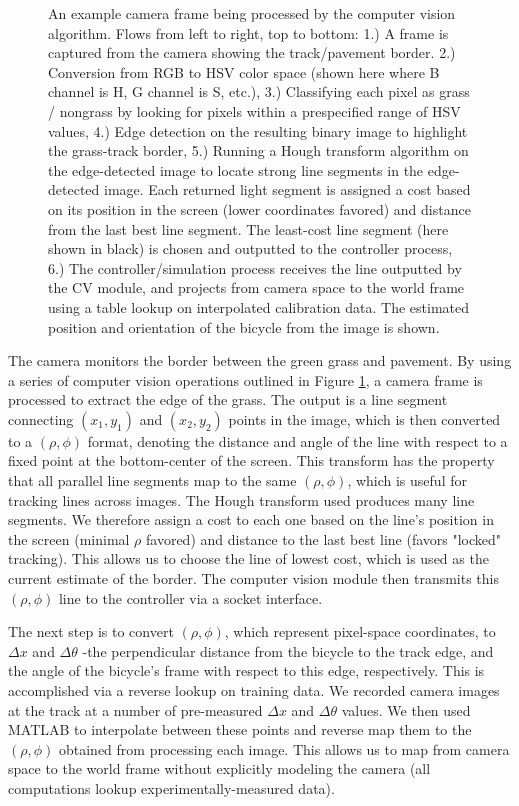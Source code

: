 \documentclass[aps,twocolumn,secnumarabic,balancelastpage,amsmath,amssymb,nofootinbib]{revtex4-1}
\begin{document}
\begin{figure}
\caption{An example camera frame being processed by the computer vision algorithm. Flows from left to right, top to bottom: 1.) A frame is captured from the camera showing the track/pavement border. 2.) Conversion from RGB to HSV color space (shown here where B channel is H, G channel is S, etc.), 3.) Classifying each pixel as grass / nongrass by looking for pixels within a prespecified range of HSV values, 4.) Edge detection on the resulting binary image to highlight the grass-track border, 5.) Running a Hough transform algorithm on the edge-detected image to locate strong line segments in the edge-detected image. Each returned light segment is assigned a cost based on its position in the screen (lower coordinates favored) and distance from the last best line segment. The least-cost line segment (here shown in black) is chosen and outputted to the controller process, 6.) The controller/simulation process receives the line outputted by the CV module, and projects from camera space to the world frame using a table lookup on interpolated calibration data. The estimated position and orientation of the bicycle from the image is shown.}
\label{fig:CVOverview}
\end{figure}


The camera monitors the border between the green grass and pavement. By using a series of computer vision operations outlined in Figure \ref{fig:CVOverview}, a camera frame is processed to extract the edge of the grass. The output is a line segment connecting $(x_1, y_1)$ and $(x_2, y_2)$ points in the image, which is then converted to a $(\rho, \phi)$ format, denoting the distance and angle of the line with respect to a fixed point at the bottom-center of the screen. This transform has the property that all parallel line segments map to the same $(\rho, \phi)$, which is useful for tracking lines across images. The Hough transform used produces many line segments. We therefore assign a cost to each one based on the line's position in the screen (minimal $\rho$ favored) and distance to the last best line (favors "locked" tracking). This allows us to choose the line of lowest cost, which is used as the current estimate of the border. The computer vision module then transmits this $(\rho, \phi)$ line to the controller via a socket interface.

The next step is to convert $(\rho, \phi)$, which represent pixel-space coordinates, to $\Delta x$ and $\Delta \theta$ -the perpendicular distance from the bicycle to the track edge, and the angle of the bicycle's frame with respect to this edge, respectively. This is accomplished via a reverse lookup on training data. We recorded camera images at the track at a number of pre-measured $\Delta x$ and $\Delta \theta$ values. We then used MATLAB to interpolate between these points and reverse map them to the $(\rho, \phi)$ obtained from processing each image. This allows us to map from camera space to the world frame without explicitly modeling the camera (all computations lookup experimentally-measured data).
\end{document}
